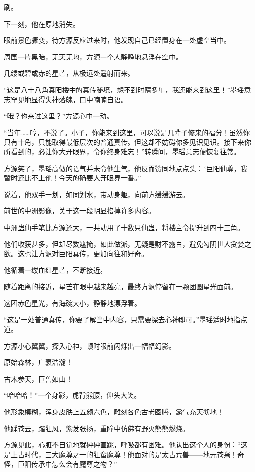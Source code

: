 \begin{this_body}
刷。

下一刻，他在原地消失。

眼前景色骤变，待方源反应过来时，他发现自己已经置身在一处虚空当中。

周围一片黑暗，无天无地，方源一个人静静地悬浮在空中。

几缕或碧或赤的星芒，从极远处遥射而来。

“这是八十八角真阳楼中的真传秘境，想不到时隔多年，我还能来到这里！”墨瑶意志罕见地显得失神落魄，口中喃喃自语。

“哦？你来过这里？”方源心中一动。

“当年……哼，不说了。小子，你能来到这里，可以说是几辈子修来的福分！虽然你只有十角，只能取得最低层次的普通真传。但这却不妨碍你多见识见识。接下来你所看到的，必让你大开眼界，令你终身难忘！”转瞬间，墨瑶意志便恢复往常。

方源笑了，墨瑶高傲的语气并未令他生气，他反而赞同地点点头：“巨阳仙尊，我暂时还比不上他！今天的确要大开眼界一番。”

说着，他双手一划，如同划水，带动身躯，向前方缓缓游去。

前世的中洲影像，关于这一段明显掐掉许多内容。

中洲蛊仙手笔比方源还大，一共动用了十数只仙蛊，将楼主令提升到四十三角。

他们收获甚多，但却尽数遮掩，如此做派，无疑是财不露白，避免勾阴世人贪婪之欲。这也让方源对巨阳真传，更加向往和好奇。

他循着一缕血红星芒，不断接近。

随着距离的接近，星芒在眼中越来越亮，最终方源停留在一颗团圆星光面前。

这团赤色星光，有海碗大小，静静地漂浮着。

“这是一处普通真传，你要了解当中内容，只需要探去心神即可。”墨瑶适时地指点道。

方源小心翼翼，探入心神，顿时眼前闪烁出一幅幅幻影。

原始森林，广袤浩瀚！

古木参天，巨兽如山！

“哈哈哈！”一个身影，虎背熊腰，仰头大笑。

他形象模糊，浑身皮肤上五颜六色，雕刻各色古老图腾，霸气充天彻地！

他踩苍云，踏狂风，紫发张扬，重瞳中仿佛有野火熊熊燃烧。

方源见此，心脏不自觉地就砰砰直跳，呼吸都有困难。他认出这个人的身份：“这是上古时代，三大魔尊之一的狂蛮魔尊！他面对的是太古荒兽——地元苍枭！奇怪，巨阳传承中怎么会有魔尊之物？”


\end{this_body}
